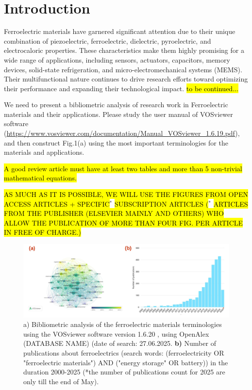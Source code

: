 \documentclass[a4paper,fleqn]{cas-sc}
\begin{document}
\section{Introduction}\label{intro}
\par Ferroelectric materials have garnered significant attention due to their unique combination of piezoelectric, ferroelectric,  dielectric, pyroelectric, and electrocaloric properties. These characteristics make them highly promising for a wide range of applications, including sensors, actuators, capacitors, memory devices, solid-state refrigeration, and micro-electromechanical systems (MEMS). Their multifunctional nature continues to drive research efforts toward optimizing their performance and expanding their technological impact. \hl{to be continued...}
\par We need to present a bibliometric analysis of research work in Ferroelectric materials and their applications. Please study the user manual of VOSviewer software (\url{https://www.vosviewer.com/documentation/Manual_VOSviewer_1.6.19.pdf}), and then construct Fig.1(a) using the most important terminologies for the materials and applications. 
\par\par \hl{A good review article must have at least two tables and more than 5 non-trivial mathematical equations.}
\par \hl{AS MUCH AS IT IS POSSIBLE, WE WILL USE THE FIGURES FROM OPEN ACCESS ARTICLES + SPECIFIC}$^{*}$ \hl{SUBSCRIPTION ARTICLES (}$^{*}$ \hl{ARTICLES FROM THE PUBLISHER (ELSEVIER MAINLY AND OTHERS) WHO ALLOW THE PUBLICATION OF MORE THAN FOUR FIG. PER ARTICLE IN FREE OF CHARGE.)} 
\begin{figure}[htpb]
    \centering
    \includegraphics[width=0.84\linewidth]{Fig1.jpg}
    \caption{{a)} Bibliometric analysis of the ferroelectric materials terminologies using the VOSviewer software version {1.6.20} \cite{vanEck2010-Scientometrics}, using OpenAlex (DATABASE NAME) (date of search: {27.06.2025}. \textbf{b)} Number of publications about ferroelectrics (search words: (ferroelectricity OR "ferroelectric materials") AND ("energy storage" OR battery)) in the duration  2000-2025 (*the number of publications count for 2025 are only till the end of May). }
    \label{fig:enter-label}
\end{figure}
\end{document}
